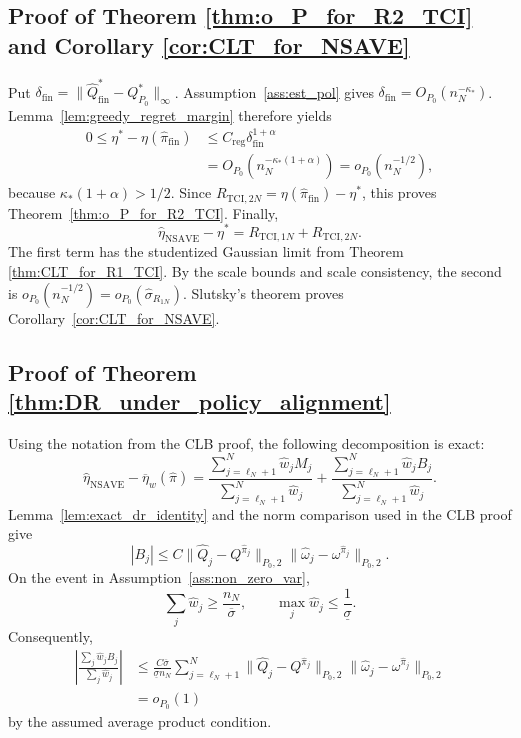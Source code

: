 \documentclass[12pt]{article}
\theoremstyle{remark}\newtheorem{remark}[theorem]{Remark}\theoremstyle{plain}
\begin{document}
\subsection{Proof of Theorem \ref{thm:o_P_for_R2_TCI} and
Corollary \ref{cor:CLT_for_NSAVE}}

Put
$\delta_{\mathrm{fin}}
  =\|\widehat Q_{\mathrm{fin}}^*-Q_{P_0}^*\|_\infty$.
Assumption~\ref{ass:est_pol} gives
$\delta_{\mathrm{fin}}=O_{P_0}(n_N^{-\kappa_*})$.
Lemma~\ref{lem:greedy_regret_margin} therefore yields
\[
    \begin{aligned}
    0\leq\eta^*-\eta(\widehat\pi_{\mathrm{fin}})
    &\leq C_{\mathrm{reg}}\delta_{\mathrm{fin}}^{1+\alpha}\\
    &=O_{P_0}\!
    \left(n_N^{-\kappa_*(1+\alpha)}\right)
    =o_{P_0}(n_N^{-1/2}),
    \end{aligned}
\]
because $\kappa_*(1+\alpha)>1/2$.  Since
$R_{\mathrm{TCI},2N}
  =\eta(\widehat\pi_{\mathrm{fin}})-\eta^*$, this proves
Theorem~\ref{thm:o_P_for_R2_TCI}.
Finally,
\[
    \widehat\eta_{\mathrm{NSAVE}}-\eta^*
    =R_{\mathrm{TCI},1N}+R_{\mathrm{TCI},2N}.
\]
The first term has the studentized Gaussian limit from Theorem
\ref{thm:CLT_for_R1_TCI}.  By the scale bounds and scale consistency,
the second is
$o_{P_0}(n_N^{-1/2})
  =o_{P_0}(\widehat\sigma_{R_{1N}})$.
Slutsky's theorem proves
Corollary~\ref{cor:CLT_for_NSAVE}.

\subsection{Proof of Theorem \ref{thm:DR_under_policy_alignment}}

Using the notation from the CLB proof, the following decomposition is
exact:
\[
    \widehat\eta_{\mathrm{NSAVE}}
    -\overline\eta_w(\widehat\pi)
    =
    \frac{\sum_{j=\ell_N+1}^N\widehat w_jM_j}
    {\sum_{j=\ell_N+1}^N\widehat w_j}
    +
    \frac{\sum_{j=\ell_N+1}^N\widehat w_jB_j}
    {\sum_{j=\ell_N+1}^N\widehat w_j}.
\]
Lemma~\ref{lem:exact_dr_identity} and the norm comparison used in the
CLB proof give
\[
    |B_j|
    \leq C
    \|\widehat Q_j-Q^{\widehat\pi_j}\|_{P_0,2}
    \|\widehat\omega_j-\omega^{\widehat\pi_j}\|_{P_0,2}.
\]
On the event in Assumption~\ref{ass:non_zero_var},
\[
    \sum_j\widehat w_j\geq
    \frac{n_N}{\overline\sigma},
    \qquad
    \max_j\widehat w_j\leq\frac1{\underline\sigma}.
\]
Consequently,
\[
    \begin{aligned}
    \left|
    \frac{\sum_j\widehat w_jB_j}
    {\sum_j\widehat w_j}\right|
    &\leq
    \frac{C\overline\sigma}{\underline\sigma n_N}
    \sum_{j=\ell_N+1}^N
    \|\widehat Q_j-Q^{\widehat\pi_j}\|_{P_0,2}
    \|\widehat\omega_j-\omega^{\widehat\pi_j}\|_{P_0,2}\\
    &=o_{P_0}(1)
    \end{aligned}
\]
by the assumed average product condition.
\end{document}
